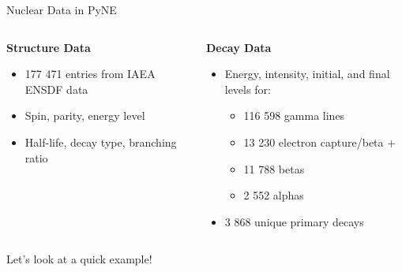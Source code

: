 \documentclass[xcolor=x11names,compress]{beamer}
\renewcommand{\(}{\begin{columns}}
\renewcommand{\)}{\end{columns}}
\newcommand{\<}[1]{\begin{column}{#1}}
\renewcommand{\>}{\end{column}}
\begin{document}
\begin{frame}{Nuclear Data in PyNE}

	\begin{columns}[T]
  	\begin{column}{0.45\textwidth}
  	    \begin{center}
  	    \textbf{Structure Data}
  	    \end{center}
        \begin{itemize}
          \item 177 471 entries from IAEA ENSDF data
          \item Spin, parity, energy level
          \item Half-life, decay type, branching ratio
        \end{itemize}
  	\end{column}
 	\begin{column}{0.45\textwidth}
        \begin{center}
  	    \textbf{Decay Data}
  	    \end{center}
        \begin{itemize}
          \item Energy, intensity, initial, and final levels for:
          \begin{itemize}
            \item 116 598 gamma lines
            \item 13 230 electron capture/beta +
            \item 11 788 betas
            \item 2 552 alphas
          \end{itemize}
          \item 3 868 unique primary decays
        \end{itemize}
  	\end{column}
	\end{columns}

    \vspace*{1 em}
    Let's look at a \alert{quick example}!

\end{frame}
\end{document}
